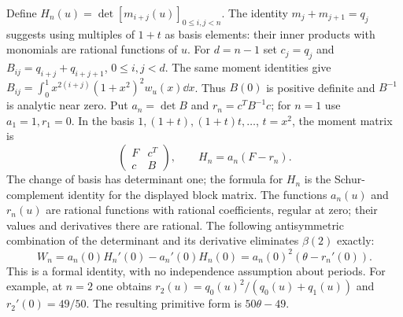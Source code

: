 Define $H_n(u)=\det[m_{i+j}(u)]_{0\leq i,j<n}$.
The identity $m_j+m_{j+1}=q_j$ suggests using multiples of $1+t$
as basis elements: their inner products with monomials are rational
functions of $u$. For $d=n-1$ set $c_j=q_j$ and
$B_{ij}=q_{i+j}+q_{i+j+1}$,
$0\leq i,j<d$. The same moment identities give
$B_{ij}=\int_0^1x^{2(i+j)}(1+x^2)^2w_u(x)\dd x$.
Thus $B(0)$ is positive definite and $B^{-1}$ is analytic near zero.
Put $a_n=\det B$ and $r_n=c^TB^{-1}c$; for $n=1$
use $a_1=1,r_1=0$. In the basis
$1,(1+t),(1+t)t,\ldots$, $t=x^2$, the moment matrix is
\[
 \begin{pmatrix}F&c^T\\c&B\end{pmatrix},\qquad
 H_n=a_n(F-r_n).
\]
The change of basis has determinant one; the formula for $H_n$
is the Schur-complement identity for the displayed block matrix.
The functions $a_n(u)$ and $r_n(u)$ are rational functions with rational
coefficients, regular at zero; their values and derivatives there are
rational. The following antisymmetric combination of the determinant
and its derivative eliminates $\beta(2)$ exactly:
\begin{equation}\label{eq:variation}
 W_n=a_n(0)H_n'(0)-a_n'(0)H_n(0)
       =a_n(0)^2(\theta-r_n'(0)).
\end{equation}
This is a formal identity, with no independence assumption about periods.
For example, at $n=2$ one obtains
$r_2(u)=q_0(u)^2/(q_0(u)+q_1(u))$ and $r_2'(0)=49/50$.
The resulting primitive form is $50\theta-49$.

